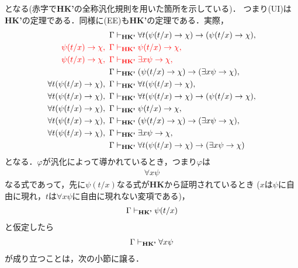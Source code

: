 	となる(赤字で{\bf HK'}の全称汎化規則を用いた箇所を示している)．
	つまり(UI)は{\bf HK'}の定理である．同様に(EE)も{\bf HK'}の定理である．実際，
	\begin{align}
		\Gamma &\vdash_{{\scriptsize \mbox{{\bf HK'}}}} 
			\forall t (\psi(t/x) \rightarrow \chi) 
			\rightarrow (\psi(t/x) \rightarrow \chi), \\
		\color{red}\psi(t/x) \rightarrow \chi,\ \Gamma &
		\color{red}\vdash_{{\scriptsize \mbox{{\bf HK'}}}}
			\psi(t/x) \rightarrow \chi, \\
		\color{red}\psi(t/x) \rightarrow \chi,\ \Gamma &
		\color{red}\vdash_{{\scriptsize \mbox{{\bf HK'}}}}
			\exists x \psi \rightarrow \chi, \\
		\Gamma &\vdash_{{\scriptsize \mbox{{\bf HK'}}}} (\psi(t/x) \rightarrow \chi) 
			\rightarrow (\exists x \psi \rightarrow \chi), \\
		\forall t (\psi(t/x) \rightarrow \chi),\ \Gamma
			&\vdash_{{\scriptsize \mbox{{\bf HK'}}}} \forall t (\psi(t/x) \rightarrow \chi), \\
		\forall t (\psi(t/x) \rightarrow \chi),\ \Gamma
			&\vdash_{{\scriptsize \mbox{{\bf HK'}}}} \forall t (\psi(t/x) \rightarrow \chi)
			\rightarrow (\psi(t/x) \rightarrow \chi), \\
		\forall t (\psi(t/x) \rightarrow \chi),\ \Gamma
			&\vdash_{{\scriptsize \mbox{{\bf HK'}}}} \psi(t/x) \rightarrow \chi, \\
		\forall t (\psi(t/x) \rightarrow \chi),\ \Gamma
			&\vdash_{{\scriptsize \mbox{{\bf HK'}}}} (\psi(t/x) \rightarrow \chi) 
			\rightarrow (\exists x \psi \rightarrow \chi), \\
		\forall t (\psi(t/x) \rightarrow \chi),\ \Gamma
			&\vdash_{{\scriptsize \mbox{{\bf HK'}}}} \exists x \psi \rightarrow \chi, \\
		\Gamma &\vdash_{{\scriptsize \mbox{{\bf HK'}}}} \forall t (\psi(t/x) \rightarrow \chi) 
			\rightarrow (\exists x \psi \rightarrow \chi)
	\end{align}
	となる．$\varphi$が汎化によって導かれているとき，つまり$\varphi$は
	\begin{align}
		\forall x \psi
	\end{align}
	なる式であって，先に$\psi(t/x)$なる式が{\bf HK}から証明されているとき
	($x$は$\psi$に自由に現れ，$t$は$\forall x \psi$に自由に現れない変項である)，
	\begin{align}
		\Gamma \vdash_{{\scriptsize \mbox{{\bf HK'}}}} \psi(t/x)
	\end{align}
	と仮定したら
	\begin{align}
		\Gamma \vdash_{{\scriptsize \mbox{{\bf HK'}}}} \forall x \psi
	\end{align}
	が成り立つことは，次の小節に譲る．
	
